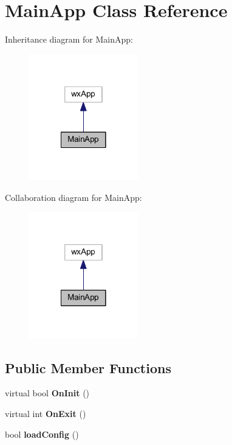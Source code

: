 \hypertarget{class_main_app}{\section{Main\-App Class Reference}
\label{class_main_app}
}


Inheritance diagram for Main\-App\-:\nopagebreak
\begin{figure}[H]
\begin{center}
\leavevmode
\includegraphics[width=134pt]{class_main_app__inherit__graph}
\end{center}
\end{figure}


Collaboration diagram for Main\-App\-:\nopagebreak
\begin{figure}[H]
\begin{center}
\leavevmode
\includegraphics[width=134pt]{class_main_app__coll__graph}
\end{center}
\end{figure}
\subsection*{Public Member Functions}
\begin{DoxyCompactItemize}
\item 
\hypertarget{class_main_app_aff3d398e1b61f1016c37d57798f86731}{virtual bool {\bfseries On\-Init} ()}\label{class_main_app_aff3d398e1b61f1016c37d57798f86731}

\item 
\hypertarget{class_main_app_aff49a6bb4a0494d717a3136e9fe17351}{virtual int {\bfseries On\-Exit} ()}\label{class_main_app_aff49a6bb4a0494d717a3136e9fe17351}

\item 
\hypertarget{class_main_app_af06cc098b89d1c606aa94ad87d6b0105}{bool {\bfseries load\-Config} ()}\label{class_main_app_af06cc098b89d1c606aa94ad87d6b0105}

\end{DoxyCompactItemize}
